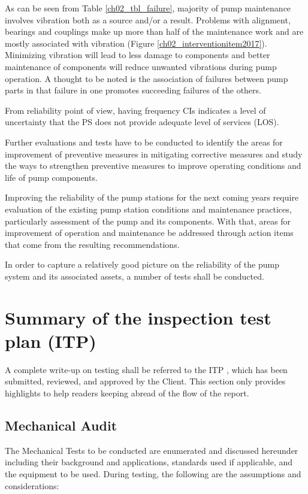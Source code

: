 As can be seen from Table \ref{ch02_tbl_failure}, majority of pump maintenance involves vibration both as a source and/or a result. Problems with alignment, bearings and couplings make up more than half of the maintenance work and are mostly associated with vibration (Figure \ref{ch02_interventionitem2017}). Minimizing vibration will lead to less damage to components and better maintenance of components will reduce unwanted vibrations during pump operation. A thought to be noted is the association of failures between pump parts in that failure in one promotes succeeding failures of the others.

From reliability point of view, having frequency CIs indicates a level of uncertainty that the PS does not provide adequate level of services (LOS).

Further evaluations and tests have to be conducted to identify the areas for improvement of preventive measures in mitigating corrective measures and study the ways to strengthen preventive measures to improve operating conditions and life of pump components. 

Improving the reliability of the pump stations for the next coming years require evaluation of the existing pump station conditions and maintenance practices, particularly assessment of the pump and its components. With that, areas for improvement of operation and maintenance be addressed through action items that come from the resulting recommendations.

In order to capture a relatively good picture on the reliability of the pump system and its associated assets, a number of tests shall be conducted. 

\section{Summary of the inspection test plan (ITP)}
\label{231}
A complete write-up on testing shall be referred to the ITP \cite{GHD2018}, which has been submitted, reviewed, and approved by the Client. This section only provides highlights to help readers keeping abread of the flow of the report.

\subsection{Mechanical Audit}
\label{232}
The Mechanical Tests to be conducted are enumerated and discussed hereunder including their background and applications, standards used if applicable, and the equipment to be used. During testing, the following are the assumptions and considerations:

